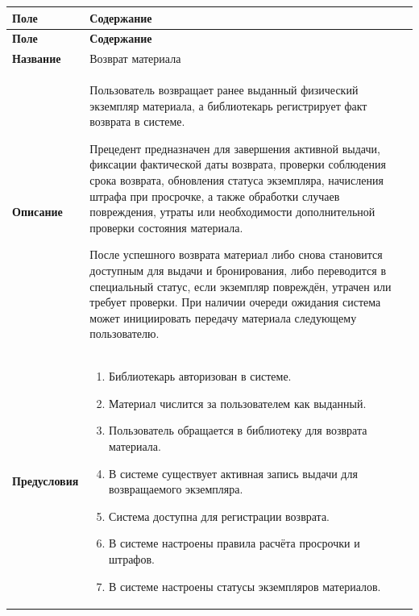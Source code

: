 \documentclass[12pt,a4paper]{article}
\begin{document}
		\begin{xltabular}{\textwidth}{
				|>{\raggedright\arraybackslash}p{2.7cm}
				|>{\raggedright\arraybackslash}X|
			}
			\hline
			\textbf{Поле} & \textbf{Содержание} \\
			\hline
			\endfirsthead
			
			\hline
			\textbf{Поле} & \textbf{Содержание} \\
			\hline
			\endhead
			
			\hline
			\endfoot
			
			\textbf{Название} &
			Возврат материала \\
			\hline
			
			\textbf{Описание} &
			Пользователь возвращает ранее выданный физический экземпляр
			материала, а библиотекарь регистрирует факт возврата в системе.
			
			Прецедент предназначен для завершения активной выдачи, фиксации
			фактической даты возврата, проверки соблюдения срока возврата,
			обновления статуса экземпляра, начисления штрафа при просрочке,
			а также обработки случаев повреждения, утраты или необходимости
			дополнительной проверки состояния материала.
			
			После успешного возврата материал либо снова становится доступным
			для выдачи и бронирования, либо переводится в специальный статус,
			если экземпляр повреждён, утрачен или требует проверки. При наличии
			очереди ожидания система может инициировать передачу материала
			следующему пользователю. \\
			\hline
			
			\textbf{Предусловия} &
			\begin{enumerate}
				\item Библиотекарь авторизован в системе.
				\item Материал числится за пользователем как выданный.
				\item Пользователь обращается в библиотеку для возврата материала.
				\item В системе существует активная запись выдачи для возвращаемого
				экземпляра.
				\item Система доступна для регистрации возврата.
				\item В системе настроены правила расчёта просрочки и штрафов.
				\item В системе настроены статусы экземпляров материалов.
			\end{enumerate} \\
			\hline
			

\end{xltabular}
\end{document}

